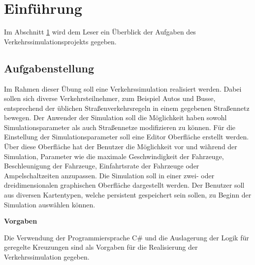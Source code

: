 \chapter{Einführung}
\label{Einführung}

Im Abschnitt \ref{Einführung} wird dem Leser ein Überblick der Aufgaben des Verkehrssimulationsprojekts gegeben.

\thispagestyle{standard}
\pagestyle{standard}

\section{Aufgabenstellung}
\label{Aufgabenstellung}

Im Rahmen dieser Übung soll eine Verkehrssimulation realisiert werden. Dabei sollen sich diverse Verkehrsteilnehmer, zum Beispiel Autos und Busse, entsprechend der üblichen Straßenverkehrsregeln in einem gegebenen Straßennetz bewegen. Der Anwender der Simulation soll die Möglichkeit haben sowohl Simulationsparameter als auch Straßennetze modifizieren zu können. Für die Einstellung der Simulationsparameter soll eine Editor Oberfläche erstellt werden. Über diese Oberfläche hat der Benutzer die Möglichkeit vor und während der Simulation, Parameter wie die maximale Geschwindigkeit der Fahrzeuge, Beschleunigung der Fahrzeuge, Einfahrtsrate der Fahrzeuge oder Ampelschaltzeiten anzupassen. Die Simulation soll in einer zwei- oder dreidimensionalen graphischen Oberfläche dargestellt werden. Der Benutzer soll aus diversen Kartentypen, welche persistent gespeichert sein sollen, zu Beginn der Simulation auswählen können. 

\begin{flushleft}
\textbf{Vorgaben}
\end{flushleft}
\vspace{-0.3 cm}

Die Verwendung der Programmiersprache C\# und die Auslagerung der Logik für geregelte Kreuzungen sind als Vorgaben für die Realisierung der Verkehrssimulation gegeben.
